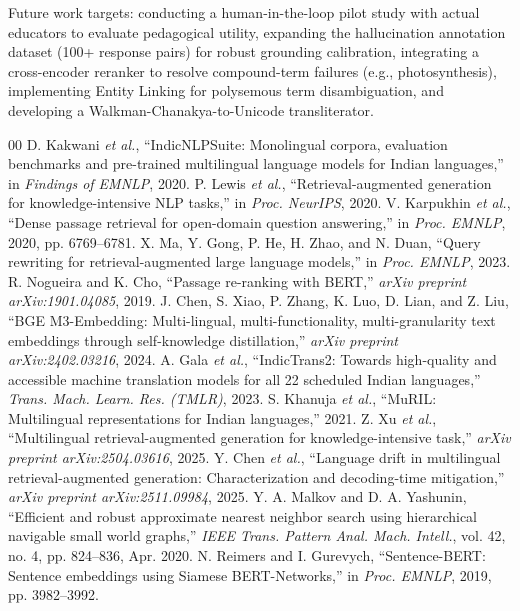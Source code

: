 \documentclass[conference]{IEEEtran}
\begin{document}
Future work targets: conducting a human-in-the-loop pilot study with actual educators to evaluate pedagogical utility, expanding the hallucination annotation dataset (100+ response pairs) for robust grounding calibration, integrating a cross-encoder reranker to resolve compound-term failures (e.g., photosynthesis), implementing Entity Linking for polysemous term disambiguation, and developing a Walkman-Chanakya-to-Unicode transliterator.

\begin{thebibliography}{00}
 D. Kakwani \textit{et al.}, ``IndicNLPSuite: Monolingual corpora, evaluation benchmarks and pre-trained multilingual language models for Indian languages,'' in \textit{Findings of EMNLP}, 2020.
 P. Lewis \textit{et al.}, ``Retrieval-augmented generation for knowledge-intensive NLP tasks,'' in \textit{Proc. NeurIPS}, 2020.
 V. Karpukhin \textit{et al.}, ``Dense passage retrieval for open-domain question answering,'' in \textit{Proc. EMNLP}, 2020, pp. 6769--6781.
 X. Ma, Y. Gong, P. He, H. Zhao, and N. Duan, ``Query rewriting for retrieval-augmented large language models,'' in \textit{Proc. EMNLP}, 2023.
 R. Nogueira and K. Cho, ``Passage re-ranking with BERT,'' \textit{arXiv preprint arXiv:1901.04085}, 2019.
 J. Chen, S. Xiao, P. Zhang, K. Luo, D. Lian, and Z. Liu, ``BGE M3-Embedding: Multi-lingual, multi-functionality, multi-granularity text embeddings through self-knowledge distillation,'' \textit{arXiv preprint arXiv:2402.03216}, 2024.
 A. Gala \textit{et al.}, ``IndicTrans2: Towards high-quality and accessible machine translation models for all 22 scheduled Indian languages,'' \textit{Trans. Mach. Learn. Res. (TMLR)}, 2023.
 S. Khanuja \textit{et al.}, ``MuRIL: Multilingual representations for Indian languages,'' 2021.
 Z. Xu \textit{et al.}, ``Multilingual retrieval-augmented generation for knowledge-intensive task,'' \textit{arXiv preprint arXiv:2504.03616}, 2025.
 Y. Chen \textit{et al.}, ``Language drift in multilingual retrieval-augmented generation: Characterization and decoding-time mitigation,'' \textit{arXiv preprint arXiv:2511.09984}, 2025.
 Y. A. Malkov and D. A. Yashunin, ``Efficient and robust approximate nearest neighbor search using hierarchical navigable small world graphs,'' \textit{IEEE Trans. Pattern Anal. Mach. Intell.}, vol. 42, no. 4, pp. 824--836, Apr. 2020.
 N. Reimers and I. Gurevych, ``Sentence-BERT: Sentence embeddings using Siamese BERT-Networks,'' in \textit{Proc. EMNLP}, 2019, pp. 3982--3992.

\end{thebibliography}
\end{document}
